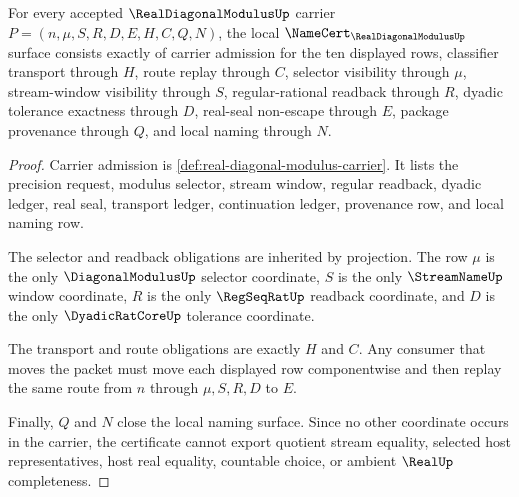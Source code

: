 \begin{theorem}
\label{thm:real-diagonal-modulus-namecert-obligations}
For every accepted $\RealDiagonalModulusUp$ carrier $P=(n,\mu,S,R,D,E,H,C,Q,N)$, the local $\NameCert_{\RealDiagonalModulusUp}$ surface consists exactly of carrier admission for the ten displayed rows, classifier transport through $H$, route replay through $C$, selector visibility through $\mu$, stream-window visibility through $S$, regular-rational readback through $R$, dyadic tolerance exactness through $D$, real-seal non-escape through $E$, package provenance through $Q$, and local naming through $N$.
\end{theorem}
\begin{proof}
Carrier admission is \autoref{def:real-diagonal-modulus-carrier}. It lists the precision request, modulus selector, stream window, regular readback, dyadic ledger, real seal, transport ledger, continuation ledger, provenance row, and local naming row.

The selector and readback obligations are inherited by projection. The row $\mu$ is the only $\DiagonalModulusUp$ selector coordinate, $S$ is the only $\StreamNameUp$ window coordinate, $R$ is the only $\RegSeqRatUp$ readback coordinate, and $D$ is the only $\DyadicRatCoreUp$ tolerance coordinate.

The transport and route obligations are exactly $H$ and $C$. Any consumer that moves the packet must move each displayed row componentwise and then replay the same route from $n$ through $\mu,S,R,D$ to $E$.

Finally, $Q$ and $N$ close the local naming surface. Since no other coordinate occurs in the carrier, the certificate cannot export quotient stream equality, selected host representatives, host real equality, countable choice, or ambient $\RealUp$ completeness.
\end{proof}

